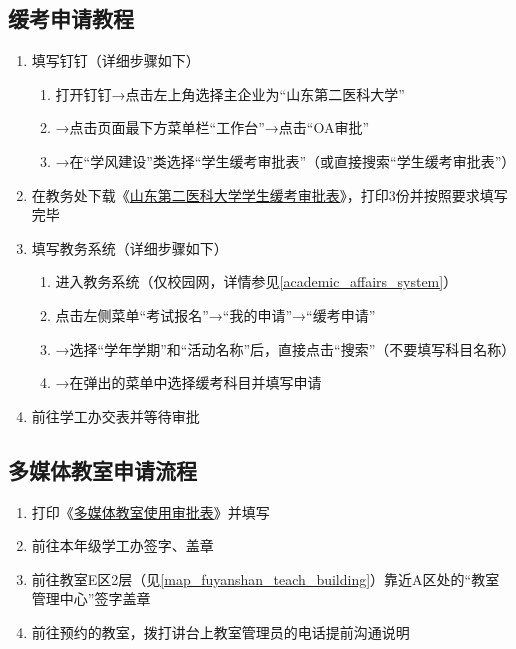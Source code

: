 \subsection[缓考申请教程]{缓考申请教程\footnotemark}
\begin{enumerate}
    \item 填写钉钉\footnotemark（详细步骤如下）
          \begin{enumerate}
              \item 打开钉钉→点击左上角选择主企业为“山东第二医科大学”
              \item →点击页面最下方菜单栏“工作台”→点击“OA审批”
              \item →在“学风建设”类选择“学生缓考审批表”（或直接搜索“学生缓考审批表”）
          \end{enumerate}
    \item 在教务处下载《\uline{\href{https://jwch.sdsmu.edu.cn/_upload/article/files/f7/d0/c172c4f74eecba307f700cde1a21/99599310-0254-48be-adc5-fcafa99e7341.doc}{山东第二医科大学学生缓考审批表}}》，打印3份并按照要求填写完毕
    \item 填写教务系统（详细步骤如下）
          \begin{enumerate}
              \item 进入教务系统（仅校园网，详情参见\uline{\ref{academic_affairs_system}}）
              \item 点击左侧菜单“考试报名”→“我的申请”→“缓考申请”
              \item →选择“学年学期”和“活动名称”后，直接点击“搜索”（不要填写科目名称）
              \item →在弹出的菜单中选择缓考科目并填写申请\footnotemark
          \end{enumerate}
    \item 前往学工办交表并等待审批
\end{enumerate}

\subsection[多媒体教室申请流程]{多媒体教室申请流程}
\begin{enumerate}
    \item 打印《\uline{\href{https://xshch.sdsmu.edu.cn/_upload/article/90/9a/94414f104377acc23eee081ca976/e714b474-f0af-4f44-b081-a5bfff20e393.doc}{多媒体教室使用审批表}}》并填写
    \item 前往本年级学工办签字、盖章
    \item 前往教室E区2层（见\uline{\ref{map_fuyanshan_teach_building}}）靠近A区处的“教室管理中心”签字盖章
    \item 前往预约的教室，拨打讲台上教室管理员的电话提前沟通说明
\end{enumerate}

